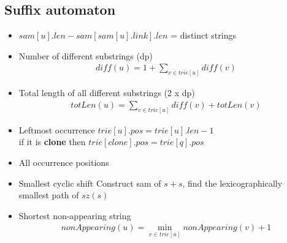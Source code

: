 \subsection{Suffix automaton }

\vspace{-5pt}

\begin{itemize}[noitemsep]
  \item 
  $sam[u].len- sam[sam[u].link].len$ = distinct strings

  \item Number of different substrings (dp) 
  \begin{gather*}
    diff(u)=1+\sum_{v \in trie[u]}{diff(v)}
  \end{gather*}

  \item Total length of all different substrings (2 x dp)
  \begin{gather*}
    totLen(u)=\sum_{v \in trie[u]}{diff(v) + totLen(v)}
  \end{gather*}
  
  \item Leftmost occurrence 
  $trie[u].pos = trie[u].len - 1$ \\
  if it is \textbf{clone} then $trie[clone].pos = trie[q].pos$ 
  
  \item All occurrence positions
  
  \item Smallest cyclic shift 
  Construct sam of $s + s$, find the lexicographically smallest path of $sz(s)$
 
  \item Shortest non-appearing string 
  \begin{gather*}
    nonAppearing(u) = \min_{v \in trie[u]}{nonAppearing(v) + 1}
  \end{gather*}
\end{itemize}
